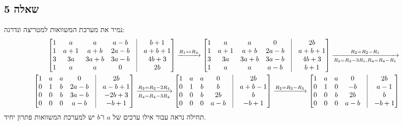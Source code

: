 \documentclass[a4paper, 10pt]{article}
\begin{document}
\begin{hebrew}
	\section{שאלה 5}
	נמיר את מערכת המשוואות למטריצה ונדרגה:
	\[
		\begin{aligned}
			\begin{bmatrix}
				1 & a & a & a - b & \vline & b + 1 \\
				1 & a + 1 & a + b & 2a - b & \vline & a + b + 1 \\
				3 & 3a & 3a + b & 3a - b & \vline & 4b + 3 \\
				1 & a & a & 0 & \vline & 2b
			\end{bmatrix}
			\xrightarrow{R_1 \leftrightarrow R_4}
			\begin{bmatrix}
				1 & a & a & 0 & \vline & 2b \\
				1 & a + 1 & a + b & 2a - b & \vline & a + b + 1 \\
				3 & 3a & 3a + b & 3a - b & \vline & 4b + 3 \\
				1 & a & a & a - b & \vline & b + 1
			\end{bmatrix}
			\xrightarrow[R_3 = R_3 - 3R_1, R_4 = R_4 - R_1]{R_2 = R_2 - R_1} \\
			\begin{bmatrix}
				1 & a & a & 0 & \vline & 2b \\
				0 & 1 & b & 2a - b & \vline & a - b + 1 \\
				0 & 0 & b & 3a - b & \vline & -2b + 3 \\
				0 & 0 & 0 & a - b & \vline & -b + 1
			\end{bmatrix}
			\xrightarrow[R_4 = R_4 - 3R_4]{R_2 = R_2 - 2R_4}
			\begin{bmatrix}
				1 & a & a & 0 & \vline & 2b \\
				0 & 1 & b & b & \vline & a + b - 1 \\
				0 & 0 & b & 2b & \vline & b \\
				0 & 0 & 0 & a - b & \vline & -b + 1
			\end{bmatrix}
			\xrightarrow{R_2 = R_2 - R_3}
			\begin{bmatrix}
				1 & a & a & 0 & \vline & 2b \\
				0 & 1 & 0 & -b & \vline & a - 1 \\
				0 & 0 & b & 2b & \vline & b \\
				0 & 0 & 0 & a - b & \vline & -b + 1
			\end{bmatrix}
		\end{aligned}
	\]
	תחילה נראה עבור אילו ערכים של $a$ ו־$b$ יש למערכת המשוואות פתרון יחיד.

\end{hebrew}
\end{document}
